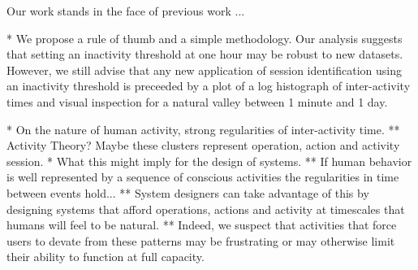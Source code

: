 Our work stands in the face of previous work ...

* We propose a rule of thumb and a simple methodology.  Our analysis suggests that setting an inactivity threshold at one hour may be robust to new datasets.  However, we still advise that any new application of session identification using an inactivity threshold is preceeded by a plot of a log histograph of inter-activity times and visual inspection for a natural valley between 1 minute and 1 day. 


* On the nature of human activity, strong regularities of inter-activity time.
** Activity Theory?  Maybe these clusters represent operation, action and activity session.
* What this might imply for the design of systems.
** If human behavior is well represented by a sequence of conscious activities the regularities in time between events hold...
** System designers can take advantage of this by designing systems that afford operations, actions and activity at timescales that humans will feel to be natural.
** Indeed, we suspect that activities that force users to devate from these patterns may be frustrating or may otherwise limit their ability to function at full capacity.
